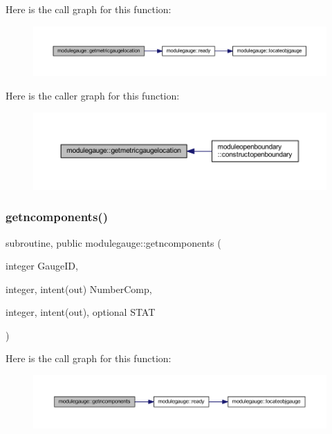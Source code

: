 Here is the call graph for this function\+:\nopagebreak
\begin{figure}[H]
\begin{center}
\leavevmode
\includegraphics[width=350pt]{namespacemodulegauge_af98cce9ae7ea92a6068724894d803842_cgraph}
\end{center}
\end{figure}
Here is the caller graph for this function\+:\nopagebreak
\begin{figure}[H]
\begin{center}
\leavevmode
\includegraphics[width=350pt]{namespacemodulegauge_af98cce9ae7ea92a6068724894d803842_icgraph}
\end{center}
\end{figure}
\mbox{\label{namespacemodulegauge_adc2b7e3c857dc1649430eaa5a0fb1882}} 
\subsubsection{\texorpdfstring{getncomponents()}{getncomponents()}}
{\footnotesize\ttfamily subroutine, public modulegauge\+::getncomponents (\begin{DoxyParamCaption}\item[{integer}]{Gauge\+ID,  }\item[{integer, intent(out)}]{Number\+Comp,  }\item[{integer, intent(out), optional}]{S\+T\+AT }\end{DoxyParamCaption})}

Here is the call graph for this function\+:\nopagebreak
\begin{figure}[H]
\begin{center}
\leavevmode
\includegraphics[width=350pt]{namespacemodulegauge_adc2b7e3c857dc1649430eaa5a0fb1882_cgraph}
\end{center}
\end{figure}
\mbox{\label{namespacemodulegauge_a7a4e1ac4c0d2468bf869594a8677a7d0}} 
